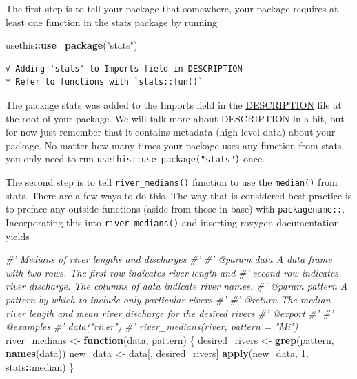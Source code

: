 \documentclass[
]{book}
\newenvironment{Shaded}{\begin{snugshade}}{\end{snugshade}}
\newcommand{\CommentTok}[1]{\textcolor[rgb]{0.56,0.35,0.01}{\textit{#1}}}
\newcommand{\ControlFlowTok}[1]{\textcolor[rgb]{0.13,0.29,0.53}{\textbf{#1}}}
\newcommand{\DecValTok}[1]{\textcolor[rgb]{0.00,0.00,0.81}{#1}}
\newcommand{\KeywordTok}[1]{\textcolor[rgb]{0.13,0.29,0.53}{\textbf{#1}}}
\newcommand{\NormalTok}[1]{#1}
\newcommand{\OperatorTok}[1]{\textcolor[rgb]{0.81,0.36,0.00}{\textbf{#1}}}
\newcommand{\StringTok}[1]{\textcolor[rgb]{0.31,0.60,0.02}{#1}}
\begin{document}
The first step is to tell your package that somewhere, your package requires at least one function in the stats package by running

\begin{Shaded}
\begin{Highlighting}[]
\NormalTok{usethis}\OperatorTok{::}\KeywordTok{use_package}\NormalTok{(}\StringTok{"stats"}\NormalTok{)}
\end{Highlighting}
\end{Shaded}

\begin{verbatim}
√ Adding 'stats' to Imports field in DESCRIPTION
* Refer to functions with `stats::fun()`
\end{verbatim}

The package stats was added to the Imports field in the \protect\hyperlink{description}{DESCRIPTION} file at the root of your package. We will talk more about DESCRIPTION in a bit, but for now just remember that it contains metadata (high-level data) about your package. No matter how many times your package uses any function from stats, you only need to run \texttt{usethis::use\_package("stats")} once.

The second step is to tell \texttt{river\_medians()} function to use the \texttt{median()} from stats. There are a few ways to do this. The way that is considered best practice is to preface any outside functions (aside from those in base) with \texttt{packagename::}. Incorporating this into \texttt{river\_medians()} and inserting roxygen documentation yields

\begin{Shaded}
\begin{Highlighting}[]
\CommentTok{#' Medians of river lengths and discharges}
\CommentTok{#'}
\CommentTok{#' @param data A data frame with two rows. The first row indicates river length and}
\CommentTok{#'   second row indicates river discharge. The columns of data indicate river names.}
\CommentTok{#' @param pattern A pattern by which to include only particular rivers}
\CommentTok{#'}
\CommentTok{#' @return The median river length and mean river discharge for the desired rivers}
\CommentTok{#' @export}
\CommentTok{#'}
\CommentTok{#' @examples}
\CommentTok{#' data("river")}
\CommentTok{#' river_medians(river, pattern = "Mi")}
\NormalTok{river_medians <-}\StringTok{ }\ControlFlowTok{function}\NormalTok{(data, pattern) \{}
\NormalTok{  desired_rivers <-}\StringTok{ }\KeywordTok{grep}\NormalTok{(pattern, }\KeywordTok{names}\NormalTok{(data))}
\NormalTok{  new_data <-}\StringTok{ }\NormalTok{data[, desired_rivers]}
  \KeywordTok{apply}\NormalTok{(new_data, }\DecValTok{1}\NormalTok{, stats}\OperatorTok{::}\NormalTok{median)}
\NormalTok{\}}
\end{Highlighting}
\end{Shaded}
\end{document}
